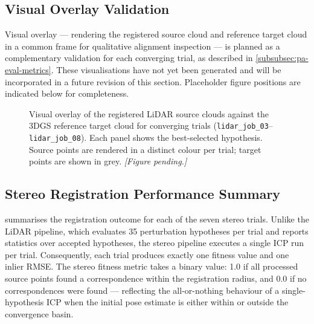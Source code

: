 \subsection{Visual Overlay Validation}
\label{subsec:pa-results-visual-overlay}

Visual overlay --- rendering the registered source cloud and reference target cloud in a common frame for qualitative alignment inspection --- is planned as a complementary validation for each converging trial, as described in \cref{subsubsec:pa-eval-metrics}. These visualisations have not yet been generated and will be incorporated in a future revision of this section. Placeholder figure positions are indicated below for completeness.

\begin{figure}[htbp]
  \centering
  \caption{Visual overlay of the registered LiDAR source clouds against the 3DGS reference target cloud for converging trials (\texttt{lidar\_job\_03}--\texttt{lidar\_job\_08}). Each panel shows the best-selected hypothesis. Source points are rendered in a distinct colour per trial; target points are shown in grey. \emph{[Figure pending.]}}
  \label{fig:pa-results-overlay}
\end{figure}

\subsection{Stereo Registration Performance Summary}
\label{subsec:pa-results-stereo-summary}

 summarises the registration outcome for each of the seven stereo trials. Unlike the LiDAR pipeline, which evaluates 35 perturbation hypotheses per trial and reports statistics over accepted hypotheses, the stereo pipeline executes a single ICP run per trial. Consequently, each trial produces exactly one fitness value and one inlier RMSE. The stereo fitness metric takes a binary value: 1.0 if all processed source points found a correspondence within the registration radius, and 0.0 if no correspondences were found --- reflecting the all-or-nothing behaviour of a single-hypothesis ICP when the initial pose estimate is either within or outside the convergence basin.

